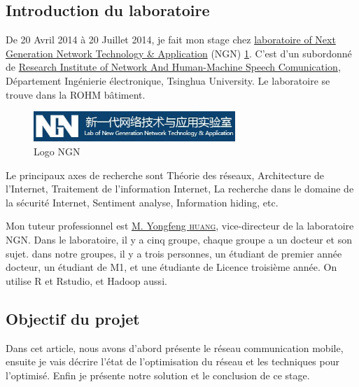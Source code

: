   \subsection{Introduction du laboratoire}
 De 20 Avril 2014 à 20 Juillet 2014, je fait mon stage chez \href{http://203.91.121.76/joomla/}{laboratoire of Next Generation Network Technology \& Application} \textsf{(NGN)} \ref{Logo NGN}. C'est d'un subordonné de \href{http://www.ee.tsinghua.edu.cn/publish/eeen/3776/index.html}{Research Institute of Network And Human-Machine Speech Comunication}, Département Ingénierie électronique, Tsinghua University. Le laboratoire se trouve dans la ROHM bâtiment.
  \begin{figure}[H]
      \centering
      \includegraphics[width=3in]{images/NGN.jpg}
      \caption{Logo NGN}
      \label{Logo NGN}
  \end{figure}
Le principaux axes de recherche sont Théorie des réseaux, Architecture de l'Internet, Traitement de l'information Internet, La recherche dans le domaine de la sécurité Internet, Sentiment analyse, Information hiding, etc.

 Mon tuteur professionnel est \href{http://203.91.121.76/joomla/index.php/staff/teacher/83-huangyongfeng}{M. Yongfeng \textsc{huang}}, vice-directeur de la laboratoire NGN. Dans le laboratoire, il y a cinq groupe, chaque groupe a un docteur et son sujet. dans notre groupes, il y a trois personnes, un étudiant de premier année docteur, un étudiant de M1, et une étudiante de Licence troisième année. On utilise R et Rstudio, et Hadoop aussi.
 
 \subsection{Objectif du projet}
Dans cet article, nous avons d'abord présente le réseau communication mobile, ensuite je vais décrire l'état de l'optimisation du réseau et les techniques pour l'optimisé. Enfin je présente notre solution et le conclusion de ce stage.